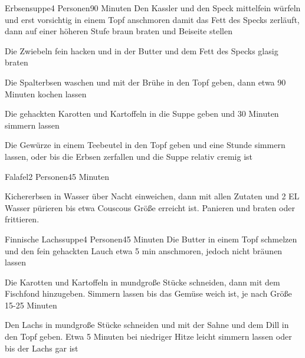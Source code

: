 
\begin{recipe}{Erbsensuppe}{4 Personen}{90 Minuten}
Den Kassler und den Speck mittelfein würfeln und erst vorsichtig in einem Topf anschmoren damit das Fett des Specks zerläuft, dann auf einer höheren Stufe braun braten und Beiseite stellen

Die Zwiebeln fein hacken und in der Butter und dem Fett des Specks glasig braten

Die Spalterbsen waschen und mit der Brühe in den Topf geben, dann etwa 90 Minuten kochen lassen

Die gehackten Karotten und Kartoffeln in die Suppe geben und 30 Minuten simmern lassen

Die Gewürze in einem Teebeutel in den Topf geben und eine Stunde simmern lassen, oder bis die Erbsen zerfallen und die Suppe relativ cremig ist
\end{recipe}


\begin{recipe}{Falafel}{2 Personen}{45 Minuten}

Kichererbsen in Wasser über Nacht einweichen, dann mit allen Zutaten und 2 EL Wasser pürieren bis etwa Couscous Größe erreicht ist. Panieren und braten oder frittieren. 
\end{recipe}


\begin{recipe}{Finnische Lachssuppe}{4 Personen}{45 Minuten}
Die Butter in einem Topf schmelzen und den fein gehackten Lauch etwa 5 min anschmoren, jedoch nicht bräunen lassen

Die Karotten und Kartoffeln in mundgroße Stücke schneiden, dann mit dem Fischfond hinzugeben.
Simmern lassen bis das Gemüse weich ist, je nach Größe 15-25 Minuten

Den Lachs in mundgroße Stücke schneiden und mit der Sahne und dem Dill in den Topf geben.
Etwa 5 Minuten bei niedriger Hitze leicht simmern lassen oder bis der Lachs gar ist
\end{recipe}


